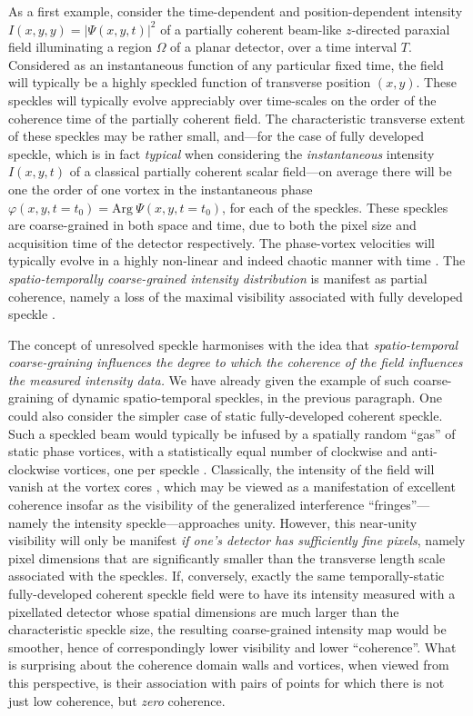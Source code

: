 \documentclass[%
 reprint,
 amsmath,amssymb,
 aps,
]{revtex4-1}
\begin{document}
As a first example, consider the time-dependent and position-dependent intensity $I(x,y,y)=|\Psi(x,y,t)|^2$ of a partially coherent beam-like $z$-directed paraxial field illuminating a region $\Omega$ of a planar detector, over a time interval $T$.  Considered as an instantaneous function of any particular fixed time, the field will typically be a highly speckled function of transverse position $(x,y)$.  These speckles will typically evolve appreciably over time-scales on the order of the coherence time of the partially coherent field.  The characteristic transverse extent of these speckles may be rather small, and---for the case of fully developed speckle, which is in fact {\em typical} when considering the {\em instantaneous} intensity $I(x,y,t)$ of a classical partially coherent scalar field---on average there will be one the order of one vortex in the instantaneous phase $\varphi(x,y,t=t_0)=\textrm{Arg} ~\Psi(x,y,t=t_0)$, for each of the speckles.  These speckles are coarse-grained in both space and time, due to both the pixel size and acquisition time of the detector respectively.  The phase-vortex velocities will typically evolve in a highly non-linear and indeed chaotic manner with time \cite{Alperin2019}. The {\em spatio-temporally coarse-grained intensity distribution} is manifest as partial coherence, namely a loss of the maximal visibility associated with fully developed speckle \cite{paganin_book}.  

The concept of unresolved speckle harmonises with the idea that {\em spatio-temporal coarse-graining influences the degree to which the coherence of the field influences the measured intensity data.}  We have already given the example of such coarse-graining of dynamic spatio-temporal speckles, in the previous paragraph.  One could also consider the simpler case of static fully-developed coherent speckle. Such a speckled beam would typically be infused by a spatially random ``gas'' of static phase vortices, with a statistically equal number of clockwise and anti-clockwise vortices, one per speckle \cite{Goodman2007,paganin_book}.  Classically, the intensity of the field will vanish at the vortex cores \cite{Dirac1931}, which may be viewed as a manifestation of excellent coherence insofar as the visibility of the generalized interference ``fringes''---namely the intensity speckle---approaches unity.  However, this near-unity visibility will only be manifest {\em if one's detector has sufficiently fine pixels}, namely pixel dimensions that are significantly smaller than the transverse length scale associated with the speckles.  If, conversely, exactly the same temporally-static fully-developed coherent speckle field were to have its intensity measured with a pixellated detector whose spatial dimensions are much larger than the characteristic speckle size, the resulting coarse-grained intensity map would be smoother, hence of correspondingly lower visibility and lower ``coherence''.  What is surprising about the coherence domain walls and vortices, when viewed from this perspective, is their association with pairs of points for which there is not just low coherence, but {\em zero} coherence.     
\end{document}
